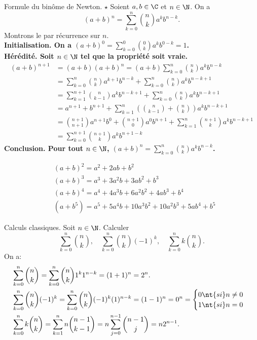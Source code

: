 \documentclass[11pt]{article}
\begin{document}
\pagebreak

\begin{thm}{Formule du binôme de Newton. $\star$}{}
    Soient $a,b\in\C$ et $n\in\N$. On a
    \begin{equation*}
        (a+b)^n=\sum_{k=0}^n\binom{n}{k}a^kb^{n-k}.
    \end{equation*}
    \tcblower
    Montrons le par récurrence sur $n$.\\
    \bf{Initialisation.} On a $(a+b)^0=\sum_{k=0}^0\binom{0}{k}a^kb^{0-k}=1$.\\
    \bf{Hérédité.} Soit $n\in\N$ tel que la propriété soit vraie.
    \begin{align*}
        (a+b)^{n+1}&=(a+b)(a+b)^n=(a+b)\sum_{k=0}^n\binom{n}{k}a^kb^{n-k}\\
        &=\sum_{k=0}^n\binom{n}{k}a^{k+1}b^{n-k}+\sum_{k=0}^n\binom{n}{k}a^kb^{n-k+1}\\
        &=\sum_{k=1}^{n+1}\binom{n}{k-1}a^kb^{n-k+1}+\sum_{k=0}^n\binom{n}{k}a^kb^{n-k+1}\\
        &=a^{n+1}+b^{n+1}+\sum_{k=1}^n\left( \binom{n}{k-1}+\binom{n}{k} \right)a^kb^{n-k+1}\\
        &=\binom{n+1}{n+1}a^{n+1}b^0+\binom{n+1}{0}a^0b^{n+1}+\sum_{k=1}^n\binom{n+1}{k}a^kb^{n-k+1}\\
        &=\sum_{k=0}^{n+1}\binom{n+1}{k}a^kb^{n+1-k}
    \end{align*}
    \bf{Conclusion.} Pour tout $n\in\N$, $(a+b)^n=\sum_{k=0}^n\binom{n}{k}a^kb^{n-k}$.
\end{thm}

\begin{ex}{}{}
    \begin{align*}
        &(a+b)^2=a^2+2ab+b^2\\
        &(a+b)^3=a^3+3a^2b+3ab^2+b^3\\
        &(a+b)^4=a^4+4a^3b+6a^2b^2+4ab^3+b^4\\
        &(a+b^5)=a^5+5a^4b+10a^3b^2+10a^2b^3+5ab^4+b^5
    \end{align*}
\end{ex}

\pagebreak

\begin{ex}{Calculs classiques.}{}
    Soit $n\in\N$. Calculer
    \begin{equation*}
        \sum_{k=0}^n\binom{n}{k}, \quad \sum_{k=0}^n\binom{n}{k}(-1)^k,\quad\sum_{k=0}^nk\binom{n}{k}.
    \end{equation*}
    \tcblower
    On a:
    \begin{align*}
        &\sum_{k=0}^n\binom{n}{k}=\sum_{k=0}^n\binom{n}{k}1^k1^{n-k}=(1+1)^n=2^n.\\
        &\sum_{k=0}^n\binom{n}{k}(-1)^k=\sum_{k=0}^n\binom{n}{k}(-1)^k(1)^{n-k}=(1-1)^n=0^n=\begin{cases}
            0 \nt{ si }n\neq0\\
            1 \nt{ si }n=0
        \end{cases}\\
        &\sum_{k=0}^nk\binom{n}{k}=\sum_{k=1}^nn\binom{n-1}{k-1}=n\sum_{j=0}^{n-1}\binom{n-1}{j}=n2^{n-1}.
    \end{align*}
\end{ex}
\end{document}
